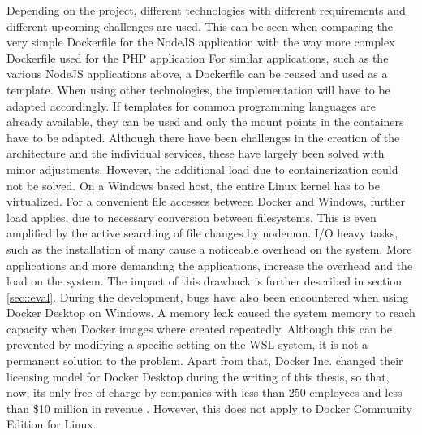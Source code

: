         Depending on the project, different technologies with different requirements and different upcoming challenges are used. This can be seen when comparing the very simple Dockerfile for the NodeJS application with the way more complex Dockerfile used for the PHP application
        For similar applications, such as the various NodeJS applications above, a Dockerfile can be reused and used as a template. When using other technologies, the implementation will have to be adapted accordingly. If templates for common programming languages are already available, they can be used and only the mount points in the containers have to be adapted. \newline
        Although there have been challenges in the creation of the architecture and the individual services, these have largely been solved with minor adjustments. However, the additional load due to containerization could not be solved. On a Windows based host, the entire Linux kernel has to be virtualized. For a convenient file accesses between Docker and Windows, further load applies, due to necessary conversion between filesystems. This is even amplified by the active searching of file changes by nodemon. \acs{I/O} heavy tasks, such as the installation of many  cause a noticeable overhead on the system. More applications and more demanding the applications, increase the overhead and the load on the system. The impact of this drawback is further described in section \ref{sec::eval}. \newline
        During the development, bugs have also been encountered when using Docker Desktop on Windows. A memory leak caused the system memory to reach capacity when Docker images where created repeatedly. Although this can be prevented by modifying a specific setting on the \ac{WSL} system, it is not a permanent solution to the problem. Apart from that, Docker Inc. changed their licensing model for Docker Desktop during the writing of this thesis, so that, now, its only free of charge by companies with less than 250 employees and less than \$10 million in revenue \cite{dockerblog}. However, this does not apply to Docker Community Edition for Linux.

